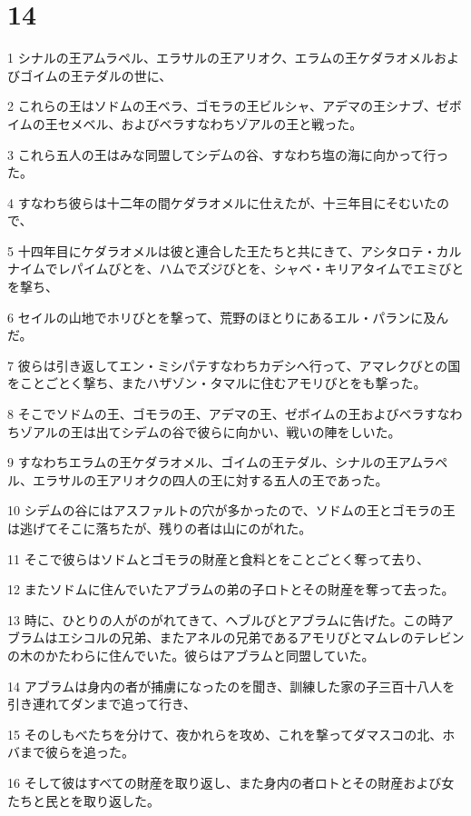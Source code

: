 \chapter{14}

\par 1 シナルの王アムラペル、エラサルの王アリオク、エラムの王ケダラオメルおよびゴイムの王テダルの世に、
\par 2 これらの王はソドムの王ベラ、ゴモラの王ビルシャ、アデマの王シナブ、ゼボイムの王セメベル、およびベラすなわちゾアルの王と戦った。
\par 3 これら五人の王はみな同盟してシデムの谷、すなわち塩の海に向かって行った。
\par 4 すなわち彼らは十二年の間ケダラオメルに仕えたが、十三年目にそむいたので、
\par 5 十四年目にケダラオメルは彼と連合した王たちと共にきて、アシタロテ・カルナイムでレパイムびとを、ハムでズジびとを、シャベ・キリアタイムでエミびとを撃ち、
\par 6 セイルの山地でホリびとを撃って、荒野のほとりにあるエル・パランに及んだ。
\par 7 彼らは引き返してエン・ミシパテすなわちカデシへ行って、アマレクびとの国をことごとく撃ち、またハザゾン・タマルに住むアモリびとをも撃った。
\par 8 そこでソドムの王、ゴモラの王、アデマの王、ゼボイムの王およびベラすなわちゾアルの王は出てシデムの谷で彼らに向かい、戦いの陣をしいた。
\par 9 すなわちエラムの王ケダラオメル、ゴイムの王テダル、シナルの王アムラペル、エラサルの王アリオクの四人の王に対する五人の王であった。
\par 10 シデムの谷にはアスファルトの穴が多かったので、ソドムの王とゴモラの王は逃げてそこに落ちたが、残りの者は山にのがれた。
\par 11 そこで彼らはソドムとゴモラの財産と食料とをことごとく奪って去り、
\par 12 またソドムに住んでいたアブラムの弟の子ロトとその財産を奪って去った。
\par 13 時に、ひとりの人がのがれてきて、ヘブルびとアブラムに告げた。この時アブラムはエシコルの兄弟、またアネルの兄弟であるアモリびとマムレのテレビンの木のかたわらに住んでいた。彼らはアブラムと同盟していた。
\par 14 アブラムは身内の者が捕虜になったのを聞き、訓練した家の子三百十八人を引き連れてダンまで追って行き、
\par 15 そのしもべたちを分けて、夜かれらを攻め、これを撃ってダマスコの北、ホバまで彼らを追った。
\par 16 そして彼はすべての財産を取り返し、また身内の者ロトとその財産および女たちと民とを取り返した。
